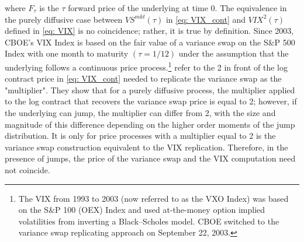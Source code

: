 \documentclass[12pt]{article}
\begin{document}
where $F_\tau$ is the $\tau$ forward price of the underlying at time $0$. The equivalence in the purely diffusive case between $VS^{mkt}(\tau)$ in \eqref{eq: VIX_cont} and $VIX^2(\tau)$ defined in \eqref{eq: VIX} is no coincidence; rather, it is true by definition. Since 2003, CBOE's VIX Index is based on the fair value of a variance swap on the S\&P 500 Index with one month to maturity $(\tau = 1/12)$ under the assumption that the underlying follows a continuous price process.\footnote{The VIX from 1993 to 2003  (now referred to as the VXO Index) was based on the S\&P 100 (OEX) Index and used at-the-money option implied volatilities from inverting a Black–Scholes model. CBOE switched to the variance swap replicating approach on September 22, 2003. } \cite{carr2012variance} refer to the 2 in front of the log contract price in \eqref{eq: VIX_cont} needed to replicate the variance swap as the "multiplier". They show that for a purely diffusive process, the multiplier applied to the log contract that recovers the variance swap price is equal to 2; however, if the underlying can jump, the multiplier can differ from 2, with the size and magnitude of this difference depending on the higher order moments of the jump distribution. It is only for price processes with a multiplier equal to 2 is the variance swap construction equivalent to the VIX replication. Therefore, in the presence of jumps, the price of the variance swap and the VIX computation need not coincide. 
\end{document}
